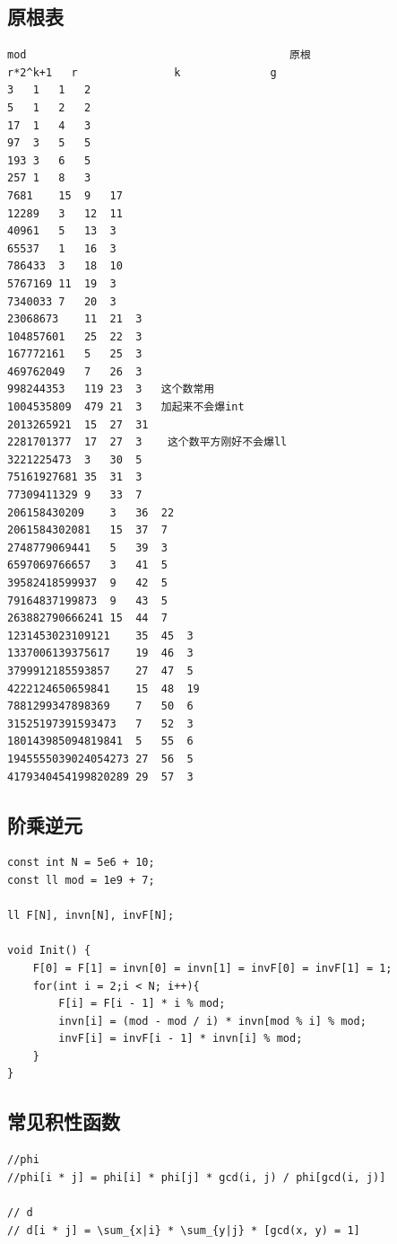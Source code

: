 \documentclass[twoside]{article}
\begin{document}
\subsection{原根表}
\begin{lstlisting}
mod                                         原根
r*2^k+1   r               k              g
3	1	1	2
5	1	2	2
17	1	4	3
97	3	5	5
193	3	6	5
257	1	8	3
7681	15	9	17
12289	3	12	11
40961	5	13	3
65537	1	16	3
786433	3	18	10
5767169	11	19	3
7340033	7	20	3
23068673	11	21	3
104857601	25	22	3
167772161	5	25	3
469762049	7	26	3
998244353	119	23	3   这个数常用
1004535809	479	21	3   加起来不会爆int
2013265921	15	27	31
2281701377	17	27	3    这个数平方刚好不会爆ll
3221225473	3	30	5
75161927681	35	31	3
77309411329	9	33	7
206158430209	3	36	22
2061584302081	15	37	7
2748779069441	5	39	3
6597069766657	3	41	5
39582418599937	9	42	5
79164837199873	9	43	5
263882790666241	15	44	7
1231453023109121	35	45	3
1337006139375617	19	46	3
3799912185593857	27	47	5
4222124650659841	15	48	19
7881299347898369	7	50	6
31525197391593473	7	52	3
180143985094819841	5	55	6
1945555039024054273	27	56	5
4179340454199820289	29	57	3
\end{lstlisting}
\subsection{阶乘逆元}
\begin{lstlisting}
const int N = 5e6 + 10;
const ll mod = 1e9 + 7;

ll F[N], invn[N], invF[N];

void Init() {
    F[0] = F[1] = invn[0] = invn[1] = invF[0] = invF[1] = 1;
    for(int i = 2;i < N; i++){
        F[i] = F[i - 1] * i % mod;
        invn[i] = (mod - mod / i) * invn[mod % i] % mod;
        invF[i] = invF[i - 1] * invn[i] % mod;
    }
}
\end{lstlisting}
\subsection{常见积性函数}
\begin{lstlisting}
//phi
//phi[i * j] = phi[i] * phi[j] * gcd(i, j) / phi[gcd(i, j)]

// d
// d[i * j] = \sum_{x|i} * \sum_{y|j} * [gcd(x, y) = 1]

\end{lstlisting}
\end{document}
